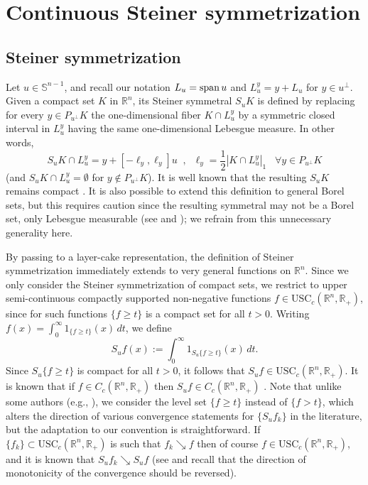 \documentclass[11pt]{article}
\theoremstyle{definition}
\theoremstyle{proof}
\DeclareMathOperator{\+}{\mathop{\tilde{+}}}
\DeclareMathOperator{\sspan}{\textnormal{span}}
\newcommand{\Real}{\mathbb{R}}
\newcommand{\R}{\mathbb{R}}
\renewcommand{\S}{\mathbb{S}}
\newcommand{\usc}{\textrm{USC}}
\newcommand{\h}{\ell}
\numberwithin{equation}{section}
\numberwithin{equation}{section}
\begin{document}
\section{Continuous Steiner symmetrization} \label{sec:Steiner}

\subsection{Steiner symmetrization} \label{subsec:Steiner}

Let $u \in \S^{n-1}$,  and recall our notation $L_u = \sspan u$ and $L_u^y = y + L_u$ for $y \in u^{\perp}$. 
Given a compact set $K$ in $\R^n$, its Steiner symmetral $S_u K$ is defined by replacing for every $y \in P_{u^{\perp}} K$ the one-dimensional fiber $K \cap L_u^y$  by a symmetric closed interval in $L_u^y$ having the same one-dimensional Lebesgue measure. In other words,
\[
S_u K \cap L_u^y = y + [-\h_y,\h_y] u \;\; , \;\;  \h_y = \frac{1}{2} |K \cap L_u^y|_1 \;\;\;  \forall y \in P_{u^{\perp}} K 
\]
(and $S_u K \cap L_u^y = \emptyset$ for $y \notin P_{u^{\perp}} K$). 
It is well known that the resulting $S_u K$ remains compact \cite[Proposition 7.1.4]{KrantzParks-GeometryBook}. It is also possible to extend this definition to general Borel sets, but this requires caution since the resulting symmetral may not be a Borel set, only Lebesgue measurable (see \cite[Remark 7.1.6]{KrantzParks-GeometryBook} and \cite[Theorem 2.3]{EvansGariepy-BookRevised}); we refrain from this unnecessary generality here. 

By passing to a layer-cake representation, the definition of Steiner symmetrization immediately extends to very general functions on $\R^n$. Since we only consider the Steiner symmetrization of compact sets, we restrict to upper semi-continuous compactly supported non-negative functions $f \in \usc_c(\R^n,\Real_+)$, since for such functions $\{ f \geq t \}$ is a compact set for all $t > 0$. Writing $f(x) = \int_0^\infty 1_{\{f \geq t\}}(x) \, dt$, we define
\[
S_u f(x) := \int_0^\infty 1_{S_u \{ f \geq t\}}(x) \, dt . 
\]
Since $S_u \{ f \geq t\}$ is compact for all $t > 0$, it follows that $S_u f \in \usc_c(\R^n,\Real_+)$. It is known that if $f \in C_c(\R^n, \R_+)$ then $S_u f \in C_c(\R^n , \R_+)$ \cite[Theorem 6.10]{Baernstein-Book}. 
Note that unlike some authors (e.g., \cite{Baernstein-Book}), we consider the level set $\{ f \geq t\}$ instead of $\{ f > t \}$, which alters the direction of various convergence statements for $\{S_u f_k\}$ in the literature, but the adaptation to our convention is straightforward. If $\{f_k\} \subset \usc_c(\R^n,\R_+)$ is such that $f_k \searrow f$ then of course $f \in \usc_c(\R^n,\R_+)$, and it is known that $S_u f_k \searrow S_u f$ (see \cite[Propositions 1.39, 1.43, 6.3]{Baernstein-Book} and recall that the direction of monotonicity of the convergence should be reversed). 
\end{document}
